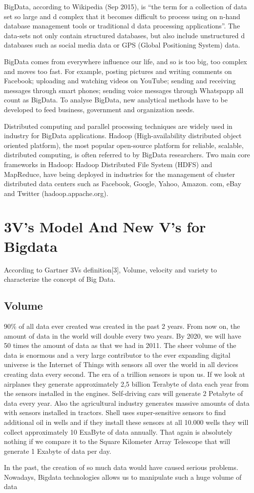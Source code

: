 BigData, according to Wikipedia (Sep 2015), is “the term for a collection of data set so large and d complex that it becomes difficult to process using on n-hand database management tools or traditional d data processing applications”. The data-sets not only contain structured databases, but also include unstructured d databases such as social media data or GPS (Global Positioning System) data.
\par BigData comes from everywhere influence our life, and so is too big, too complex and moves too fast. For example, posting pictures and writing comments on Facebook; uploading and watching videos on YouTube; sending and receiving messages through smart phones; sending voice messages through Whatspapp all count as BigData. To analyse BigData, new analytical methods have to be developed to feed business, government and organization needs.
\par Distributed computing and  parallel processing techniques are widely used in industry for BigData applications. Hadoop (High-availability distributed object oriented platform), the most  popular open-source platform for reliable, scalable, distributed computing, is often referred to by BigData researchers. Two main core frameworks in Hadoop: Hadoop Distributed File System (HDFS) and MapReduce, have being deployed in industries for the management of cluster distributed data centers such as Facebook, Google, Yahoo, Amazon. com, eBay and Twitter (hadoop.appache.org).
\section{3V’s Model And New V’s for Bigdata}
According to Gartner 3Vs definition[3], Volume, velocity and variety to characterize the concept of Big Data.
\subsection{Volume}
90\% of all data ever created was created in the past 2 years. From now on, the amount of data in the world will double every two years. By 2020, we will have 50 times the amount of data as that we had in 2011. The sheer volume of the data is enormous and a very large contributor to the ever expanding digital universe is the Internet of Things with sensors all over the world in all devices creating data every second. The era of a trillion sensors is upon us.
If we look at airplanes they generate approximately 2,5 billion Terabyte of data each year from the sensors installed in the engines.  Self-driving cars will generate 2 Petabyte of data every year. Also the agricultural industry generates massive amounts of data with sensors installed in tractors. Shell uses super-sensitive sensors to find additional oil in wells and if they install these sensors at all 10.000 wells they will collect approximately 10 ExaByte of data annually. That again is absolutely nothing if we compare it to the Square Kilometer Array Telescope that will generate 1 Exabyte of data per day.
\par In the past, the creation of so much data would have caused serious problems. Nowadays, Bigdata technologies allows us  to manipulate such a huge volume of data
